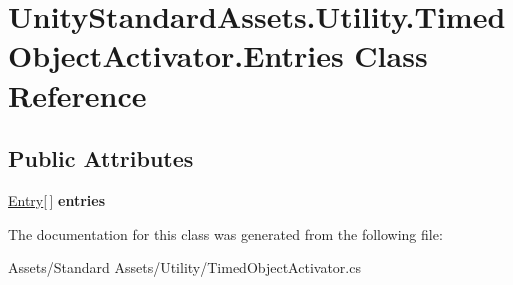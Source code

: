 \hypertarget{class_unity_standard_assets_1_1_utility_1_1_timed_object_activator_1_1_entries}{}\section{Unity\+Standard\+Assets.\+Utility.\+Timed\+Object\+Activator.\+Entries Class Reference}
\label{class_unity_standard_assets_1_1_utility_1_1_timed_object_activator_1_1_entries}
\subsection*{Public Attributes}
\begin{DoxyCompactItemize}
\item 
\hyperlink{class_unity_standard_assets_1_1_utility_1_1_timed_object_activator_1_1_entry}{Entry}\mbox{[}$\,$\mbox{]} {\bfseries entries}\hypertarget{class_unity_standard_assets_1_1_utility_1_1_timed_object_activator_1_1_entries_aab3134611f9a35c9e3a4e63ee9feab08}{}\label{class_unity_standard_assets_1_1_utility_1_1_timed_object_activator_1_1_entries_aab3134611f9a35c9e3a4e63ee9feab08}

\end{DoxyCompactItemize}


The documentation for this class was generated from the following file\+:\begin{DoxyCompactItemize}
\item 
Assets/\+Standard Assets/\+Utility/Timed\+Object\+Activator.\+cs\end{DoxyCompactItemize}
